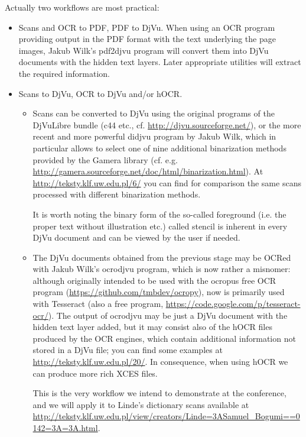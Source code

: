 \documentclass[runningheads,a4paper]{llncs}
\begin{document}
\bigskip
Actually two workflows are most practical:
\begin{itemize}
\item Scans and OCR to PDF, PDF to DjVu.  When using an OCR program
  providing output in the PDF format with the text underlying the page
  images, Jakub Wilk's pdf2djvu program will convert them into DjVu
  documents with the hidden text layers. Later appropriate utilities
  will extract the required information.
\item Scans to DjVu, OCR to DjVu and/or hOCR. 
  \begin{itemize}
  \item Scans can be converted to DjVu using the original programs of
    the DjVuLibre bundle (c44 etc.,
    cf. \url{http://djvu.sourceforge.net/}), or the  more recent and more
    powerful didjvu  program by Jakub Wilk, which in particular allows
    to select one of nine additional binarization methods provided by the
    Gamera library
    (cf. e.g. \url{http://gamera.sourceforge.net/doc/html/binarization.html}). At
    \url{http://teksty.klf.uw.edu.pl/6/} you can find for comparison
    the same scans processed with different binarization methods.

    It is worth noting the binary form of the so-called foreground
    (i.e. the proper text without illustration etc.) called stencil is
    inherent in every DjVu document and can be viewed by the user if
    needed.

  \item The DjVu documents obtained from the previous stage may be
    OCRed with Jakub Wilk's ocrodjvu program, which is now
    rather a misnomer: although originally intended to be used with
    the ocropus free OCR program
    (\url{https://github.com/tmbdev/ocropy}), now is primarily used
    with Tesseract (also a free program,
    \url{https://code.google.com/p/tesseract-ocr/}). The output of
    ocrodjvu may be just a DjVu document with the hidden text layer
    added, but it may consist also of the hOCR files produced by the
    OCR engines, which contain additional information not stored in a
    DjVu file; you can find some examples at
    \url{http://teksty.klf.uw.edu.pl/20/}. In consequence, when using
    hOCR we can produce more rich XCES files.

    This is the very workflow we intend to demonstrate at the
    conference, and we will apply it to Linde's dictionary scans
    available at
    \url{http://teksty.klf.uw.edu.pl/view/creators/Linde=3ASamuel_Bogumi==0142=3A=3A.html}.

  \end{itemize}

\end{itemize}
\end{document}
